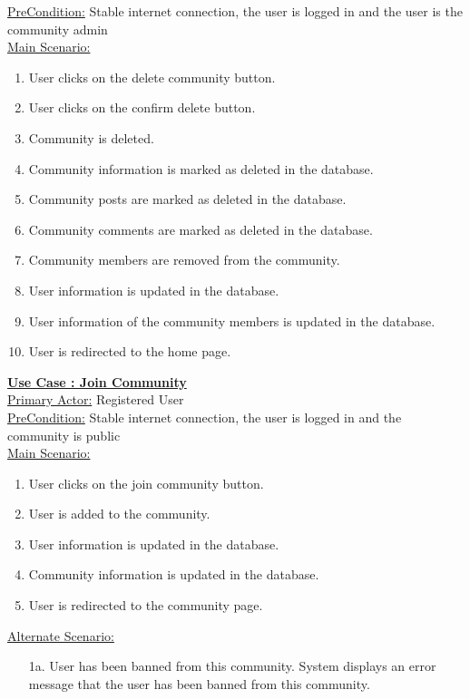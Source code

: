 \documentclass[conference,compsoc]{IEEEtran}
\newcounter{UC}
\newcommand{\nextU}{\stepcounter{UC}\theUC}
\begin{document}
\underline{PreCondition:} Stable internet connection, the user is logged in and the user is the community admin\\

\underline{Main Scenario:}\\
\begin{enumerate}
    \item User clicks on the delete community button.
    \item User clicks on the confirm delete button.
    \item Community is deleted.
    \item Community information is marked as deleted in the database.
    \item Community posts are marked as deleted in the database.
    \item Community comments are marked as deleted in the database.
    \item Community members are removed from the community.
    \item User information is updated in the database.
    \item User information of the community members is updated in the database.
    \item User is redirected to the home page.
\end{enumerate}

\underline{\textbf{Use Case \nextU: Join Community}}\\

\underline{Primary Actor:} Registered User\\

\underline{PreCondition:} Stable internet connection, the user is logged in and the community is public\\

\underline{Main Scenario:}\\
\begin{enumerate}
    \item User clicks on the join community button.
    \item User is added to the community.
    \item User information is updated in the database.
    \item Community information is updated in the database.
    \item User is redirected to the community page.
\end{enumerate}

\underline{Alternate Scenario:}\\
\begin{enumerate}
    \item [1a.] User has been banned from this community. System displays an error message that the user has been banned from this community.
\end{enumerate}
\end{document}
